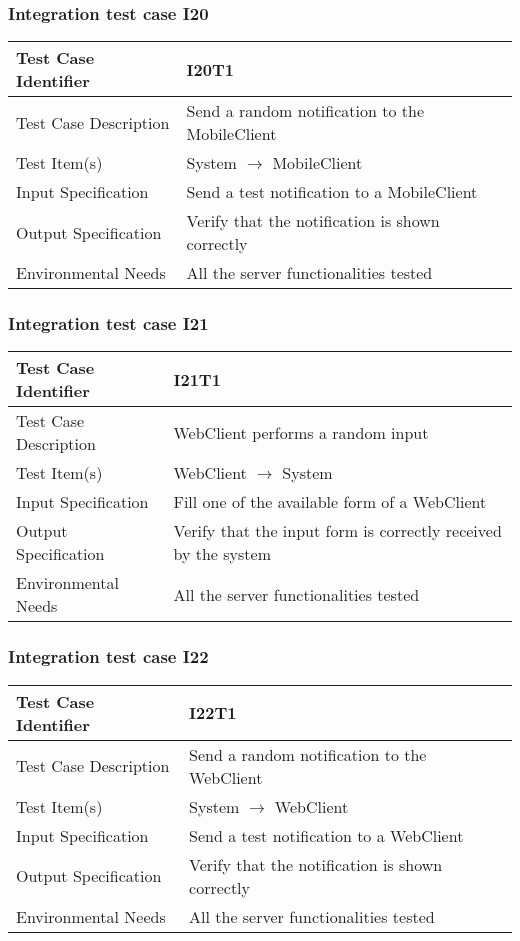 		\subsubsection{Integration test case I20}
		\begin{center}
			\begin{tabular}{ |l p{10cm}| } \hline
				Test Case Identifier & I20T1 \\ \hline
				Test Case Description & Send a random notification to the MobileClient \\ \hline
				Test Item(s) & System $\rightarrow$ MobileClient \\ \hline
				Input Specification & Send a test notification to a MobileClient \\ \hline
				Output Specification & Verify that the notification is shown correctly \\ \hline
				Environmental Needs & All the server functionalities tested \\ \hline
			\end{tabular}
		\end{center}
		\subsubsection{Integration test case I21}
		\begin{center}
			\begin{tabular}{ |l p{10cm}| } \hline
				Test Case Identifier & I21T1 \\ \hline
				Test Case Description & WebClient performs a random input  \\ \hline
				Test Item(s) & WebClient $\rightarrow$ System \\ \hline
				Input Specification & Fill one of the available form of a WebClient \\ \hline
				Output Specification & Verify that the input form is correctly received by the system \\ \hline
				Environmental Needs & All the server functionalities tested \\ \hline
			\end{tabular}
		\end{center}
		\subsubsection{Integration test case I22}
		\begin{center}
			\begin{tabular}{ |l p{10cm}| } \hline
				Test Case Identifier & I22T1 \\ \hline
				Test Case Description & Send a random notification to the WebClient \\ \hline
				Test Item(s) & System $\rightarrow$ WebClient \\ \hline
				Input Specification & Send a test notification to a WebClient \\ \hline
				Output Specification & Verify that the notification is shown correctly \\ \hline
				Environmental Needs & All the server functionalities tested \\ \hline
			\end{tabular}
		\end{center}
		